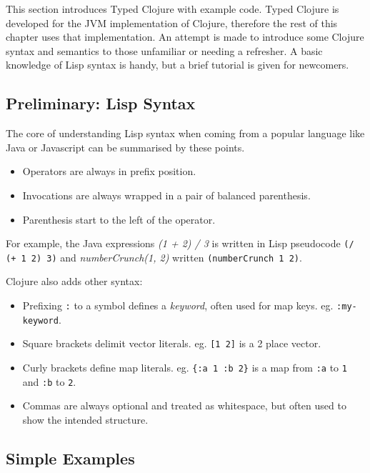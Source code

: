 This section introduces Typed Clojure with example code. 
Typed Clojure is developed for the JVM implementation of Clojure, therefore
the rest of this chapter uses that implementation.
An attempt is
made to introduce some Clojure syntax and semantics to those unfamiliar or needing a refresher.
A basic knowledge of Lisp syntax is handy, but a brief tutorial is given
for newcomers.

\subsection{Preliminary: Lisp Syntax}

The core of understanding Lisp syntax when coming from a popular language
like Java or Javascript can be summarised by these points.

\begin{itemize}
  \item Operators are always in prefix position.
  \item Invocations are always wrapped in a pair of balanced parenthesis.
  \item Parenthesis start to the left of the operator.
\end{itemize}

For example, the Java expressions \emph{(1 + 2) / 3} is written in Lisp pseudocode \lstinline|(/ (+ 1 2) 3)|
and \emph{numberCrunch(1, 2)} written \lstinline|(numberCrunch 1 2)|.

Clojure also adds other syntax:

\begin{itemize}
  \item Prefixing \lstinline|:| to a symbol defines a \emph{keyword}, often used for map keys. eg. \lstinline|:my-keyword|.
  \item Square brackets delimit vector literals. eg. \lstinline|[1 2]| is a 2 place vector.
  \item Curly brackets define map literals. eg. \lstinline|{:a 1 :b 2}| is a map from 
        \lstinline|:a| to \lstinline|1| and \lstinline|:b| to \lstinline|2|.
  \item Commas are always optional and treated as whitespace, but often used to show the intended structure.
\end{itemize}

\subsection{Simple Examples}

